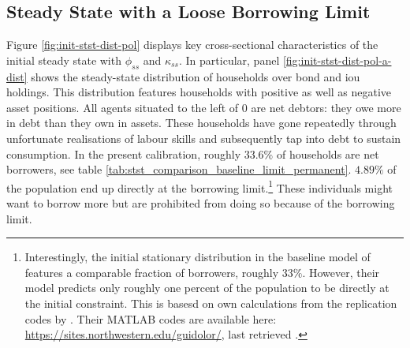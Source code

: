 \documentclass[12pt]{article} %
\numberwithin{equation}{section} %
\numberwithin{figure}{section}
\numberwithin{table}{section}
\begin{document}
\subsection{Steady State with a Loose Borrowing Limit}
\label{sec:limit-stst-loose}


Figure \ref{fig:init-stst-dist-pol} displays key cross-sectional characteristics of the initial steady state with $\phi_{ss}$ and $\kappa_{ss}$. In particular, panel \ref{fig:init-stst-dist-pol-a-dist} shows the steady-state distribution of households over bond and \Gls{iou} holdings. This distribution features households with positive as well as negative asset positions. All agents situated to the left of $0$ are net debtors: they owe more in debt than they own in assets. These households have gone repeatedly through unfortunate realisations of labour skills and subsequently tap into debt to sustain consumption. In the present calibration, roughly $33.6\%$ of households are net borrowers, see table \ref{tab:stst_comparison_baseline_limit_permanent}. $4.89\%$ of the population end up directly at the borrowing limit.\footnote{Interestingly, the initial stationary distribution in the baseline model of \textcite{gl2017} features a comparable fraction of borrowers, roughly $33\%$. However, their model predicts only roughly one percent of the population to be directly at the initial constraint. This is basesd on own calculations from the replication codes by \textcite{gl2017}. Their MATLAB codes are available here: \url{https://sites.northwestern.edu/guidolor/}, last retrieved .} These individuals might want to borrow more but are prohibited from doing so because of the borrowing limit.
\end{document}
